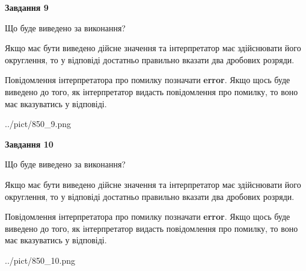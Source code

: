 \documentclass[12pt, ukrainian]{article}
\begin{document}
{\begin {Large}
{\begin {center}\textbf{Завдання 9}\end {center}}\par
Що буде виведено за виконання? \par

Якщо має бути виведено дійсне значення та інтерпретатор має здійснювати його округлення, 
то у відповіді достатньо правильно вказати два дробових розряди.

Повідомлення інтерпретатора про помилку позначати \textbf{error}.
Якщо щось буде виведено до того, як інтерпретатор видасть повідомлення про помилку, 
то воно має вказуватись у відповіді. \par

\begin{center}
	{../pict/850_9.png}
\end{center}
\newpage

{\begin {center}\textbf{Завдання 10}\end {center}}\par
Що буде виведено за виконання? \par

Якщо має бути виведено дійсне значення та інтерпретатор має здійснювати його округлення, 
то у відповіді достатньо правильно вказати два дробових розряди.

Повідомлення інтерпретатора про помилку позначати \textbf{error}.
Якщо щось буде виведено до того, як інтерпретатор видасть повідомлення про помилку, 
то воно має вказуватись у відповіді. \par

\begin{center}
	{../pict/850_10.png}
\end{center}
\newpage

\end {Large}}
\end{document}

